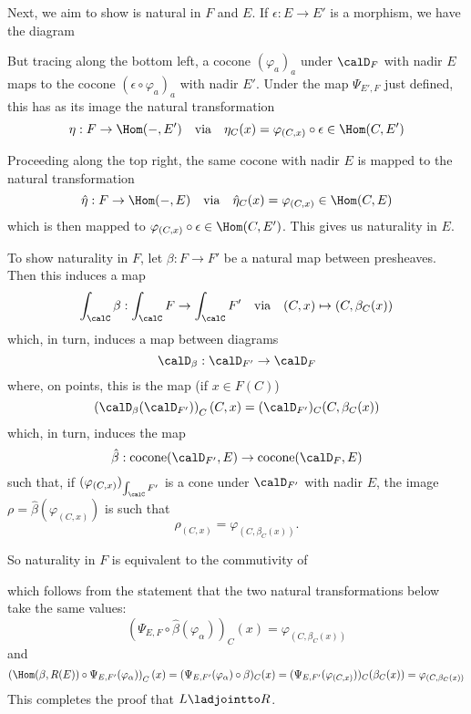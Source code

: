 \documentclass[12pt]{article}
\begin{document}
\begin{prf}
	Next, we aim to show is natural in $F$ and $E$. If $\epsilon:E\to E'$ is a morphism, we have the diagram
	\begin{center}
	\end{center}
	But tracing along the bottom left, a cocone $(\varphi_a)_a$ under $\calD_F$ with nadir $E$ maps to the cocone $(\epsilon\circ\varphi_a)_a$
	with nadir $E'$. Under the map $\Psi_{E',F}$ just defined, this has as its image the natural transformation 
	\[\eta:F\to \Hom(-,E')\quad\text{via}\quad \eta_{C}(x)=\varphi_{(C,x)}\circ\epsilon\in\Hom(C,E')\]

	Proceeding along the top right, the same cocone with nadir $E$ is mapped to the natural transformation 
	\[\hat\eta:F\to \Hom(-,E)\quad\text{via}\quad \hat\eta_{C}(x)=\varphi_{(C,x)}\in\Hom(C,E)\]
	which is then mapped to $\varphi_{(C,x)}\circ\epsilon\in\Hom(C,E')$. This gives us naturality in $E$.

	To show naturality in $F$, let $\beta:F\to F'$ be a natural map between presheaves. Then this induces a map 
	\[\int_\calC\beta:\int_\calC F\to\int_\calC F'\quad\text{via}\quad (C,x)\mapsto (C,\beta_C(x))\]
	which, in turn, induces a map between diagrams 
	\[\calD_\beta:\calD_{F'}\to \calD_{F}\]
	where, on points, this is the map (if $x\in F(C)$)
	\[\left(\calD_\beta(\calD_{F'})\right)_C(C,x)=(\calD_{F'})_C(C,\beta_C(x))\]
	which, in turn, induces the map 
	\[\hat\beta:\operatorname{cocone}(\calD_{F'},E)\to \operatorname{cocone}(\calD_{F},E)\]
	such that, if $(\varphi_{(C,x)})_{\int_\calC F'}$ is a cone under $\calD_{F'}$ with nadir $E$, 
	the image $\rho=\hat\beta(\varphi_{(C,x)})$ is such that 
	\[\rho_{(C,x)}=\varphi_{(C,\beta_C(x))}.\]

	So naturality in $F$ is equivalent to the commutivity of 
	\begin{center}
	\end{center}
	which follows from the statement that the two natural transformations below take the same values:
	\[\left(\Psi_{E,F}\circ\hat\beta(\varphi_{\alpha})\right)_C(x)=\varphi_{(C,\beta_C(x))}\]
	and
	\[\left(\Hom(\beta,R(E))\circ\Psi_{E,F'}(\varphi_{\alpha})\right)_C(x)=(\Psi_{E,F'}(\varphi_{\alpha})\circ\beta)_C(x)=(\Psi_{E,F'}(\varphi_{(C,x)}))_C(\beta_C(x))=\varphi_{(C,\beta_C(x))}\]
	This completes the proof that $L\ladjointto R$.


\end{prf}
\end{document}
